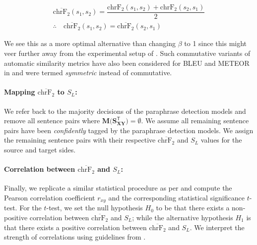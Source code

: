 \documentclass[11pt,a4paper]{article}
\begin{document}
\begin{gather}
  \overline{\text{chrF}_2}(s_1,s_2) = \dfrac{\text{chrF}_2(s_1,s_2) + \text{chrF}_2(s_2,s_1)}{2} \\[5pt]
  \therefore \quad \overline{\text{chrF}_2}(s_1,s_2) = \overline{\text{chrF}_2}(s_2,s_1)
\end{gather}

We see this as a more optimal alternative than changing $\beta$ to 1 since this might veer further away from the experimental setup of \citet{michel2019evaluation}. Such commutative variants of automatic similarity metrics have also been considered for BLEU and METEOR in \citet{wieting-etal-2019-beyond} and were termed \textit{symmetric} instead of commutative.

\paragraph{Mapping $\overline{\text{chrF}_2}$ to $S_L$:}
We refer back to the majority decisions of the paraphrase detection models and remove all sentence pairs where $\mathbf{M(S_{XY}^{\mathsf{T}}}) = \emptyset$. We assume all remaining sentence pairs have been \textit{confidently} tagged by the paraphrase detection models. We assign the remaining sentence pairs with their respective $\overline{\text{chrF}_2}$ and $S_L$ values for the source and target sides. 

\paragraph{Correlation between $\overline{\text{chrF}_2}$ and $S_L$:} Finally, we replicate a similar statistical procedure as per \citet{michel2019evaluation} and compute the Pearson correlation coefficient $r_{xy}$ and the corresponding statistical significance $t$-test. For the $t$-test, we set the null hypothesis $H_0$ to be that there exists a non-positive correlation between $\overline{\text{chrF}_2}$ and $S_L$; while the alternative hypothesis $H_1$ is that there exists a positive correlation between $\overline{\text{chrF}_2}$ and $S_L$. We interpret the strength of correlations using guidelines from \citet{schober2018correlation}.     

\end{document}
